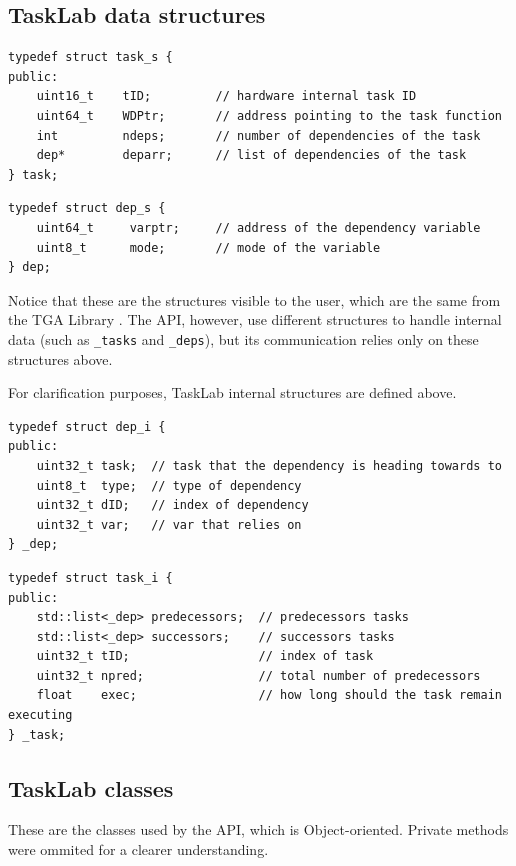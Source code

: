 \subsection{TaskLab data structures}
\begin{verbatim}
typedef struct task_s {
public:
    uint16_t    tID;         // hardware internal task ID
    uint64_t    WDPtr;       // address pointing to the task function
    int         ndeps;       // number of dependencies of the task
    dep*        deparr;      // list of dependencies of the task
} task;

\end{verbatim}

\begin{verbatim}
typedef struct dep_s {
    uint64_t     varptr;     // address of the dependency variable
    uint8_t      mode;       // mode of the variable 
} dep; 
\end{verbatim}

Notice that these are the structures visible to the user, which are the same from the TGA Library \cite{TIOGA}. The API, however, use different structures to handle internal data (such as \texttt{\_tasks} and \texttt{\_deps}), but its communication relies only on these structures above. 

For clarification purposes, TaskLab internal structures are defined above.

\begin{verbatim}
typedef struct dep_i {
public:
    uint32_t task;  // task that the dependency is heading towards to
    uint8_t  type;  // type of dependency
    uint32_t dID;   // index of dependency
    uint32_t var;   // var that relies on
} _dep;
\end{verbatim}

\begin{verbatim}
typedef struct task_i {
public:
    std::list<_dep> predecessors;  // predecessors tasks
    std::list<_dep> successors;    // successors tasks
    uint32_t tID;                  // index of task
    uint32_t npred;                // total number of predecessors
    float    exec;                 // how long should the task remain executing
} _task;
\end{verbatim}


\subsection{TaskLab classes}
These are the classes used by the API, which is Object-oriented. Private methods were ommited for a clearer understanding.

